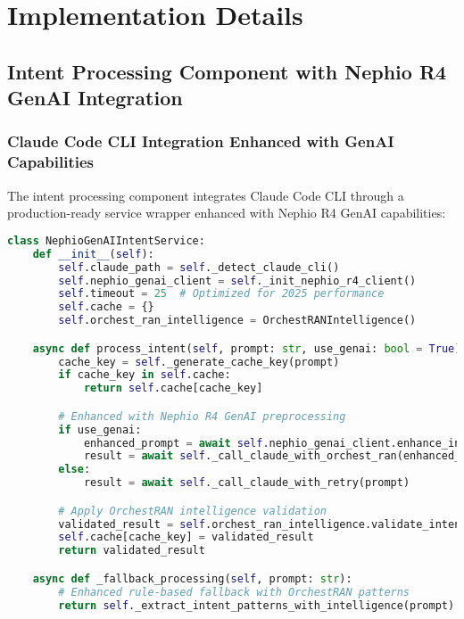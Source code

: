 \section{Implementation Details}
\label{sec:implementation}

\subsection{Intent Processing Component with Nephio R4 GenAI Integration}

\subsubsection{Claude Code CLI Integration Enhanced with GenAI Capabilities}

The intent processing component integrates Claude Code CLI through a production-ready service wrapper enhanced with Nephio R4 GenAI capabilities:

\begin{lstlisting}[language=Python, caption=Nephio GenAI Intent Service Implementation]
class NephioGenAIIntentService:
    def __init__(self):
        self.claude_path = self._detect_claude_cli()
        self.nephio_genai_client = self._init_nephio_r4_client()
        self.timeout = 25  # Optimized for 2025 performance
        self.cache = {}
        self.orchest_ran_intelligence = OrchestRANIntelligence()

    async def process_intent(self, prompt: str, use_genai: bool = True):
        cache_key = self._generate_cache_key(prompt)
        if cache_key in self.cache:
            return self.cache[cache_key]

        # Enhanced with Nephio R4 GenAI preprocessing
        if use_genai:
            enhanced_prompt = await self.nephio_genai_client.enhance_intent(prompt)
            result = await self._call_claude_with_orchest_ran(enhanced_prompt)
        else:
            result = await self._call_claude_with_retry(prompt)

        # Apply OrchestRAN intelligence validation
        validated_result = self.orchest_ran_intelligence.validate_intent(result)
        self.cache[cache_key] = validated_result
        return validated_result

    async def _fallback_processing(self, prompt: str):
        # Enhanced rule-based fallback with OrchestRAN patterns
        return self._extract_intent_patterns_with_intelligence(prompt)
\end{lstlisting}

